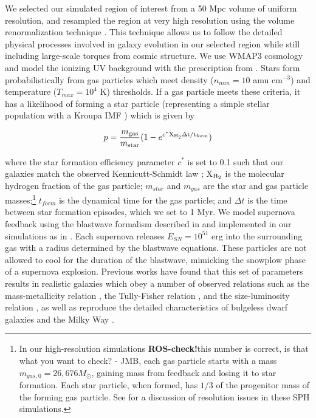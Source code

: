 \documentclass[nofootinbib,twocolumn,prd]{emulateapj}
\newcommand\editremark[1]{{\color{red}#1}}
\begin{document}
We selected our simulated region of interest from a 50 Mpc volume of
uniform resolution, and resampled the region at very high
resolution using the volume renormalization technique \citep{1993ApJ...412..455K}.
This technique allows us to follow the detailed physical processes
involved in galaxy evolution in our selected region while still
including large-scale torques from cosmic structure.  We use
WMAP3 cosmology \citep{WMAP} and model the ionizing UV background
with the prescription from \citet{1996ApJ...461...20H}.  Stars form
probabilistically from gas particles which meet density ($n_{min} =
10$ amu cm$^{-3}$) and temperature ($T_{max} = 10^4$ K) thresholds. If a gas
particle meets these criteria, it has a likelihood of forming a star
particle (representing a simple stellar population with a Kroupa IMF
\citep{2001MNRAS.322..231K}) which is given by

\begin{equation}
p = \frac{m_{\rm gas}}{m_{\rm star}} (1 - e^{c^*\rm X_{\rm H_2} \Delta t/t_{\rm form}})
\end{equation}

\noindent
where the star formation efficiency parameter $c^*$ is set to 0.1 such
that our galaxies match the observed Kennicutt-Schmidt law
\citep{1989ApJ...344..685K};  X$_{\rm H_2}$ is the molecular hydrogen fraction of the gas particle; $m_{star}$ and $m_{gas}$ are the star and gas
particle masses;\footnote{In our high-resolution simulations \textbf{ROS-check!}\editremark{this number is correct, is that what you want to check? - JMB}, each gas particle starts with a mass
  $m_{gas,0}=26,676 M_\odot$, gaining mass from feedback and losing it to star formation.  Each star particle, when
  formed, has $1/3$ of the progenitor mass of the forming gas particle.  See \cite{2010ApJ...717..121C} for a discussion
of resolution issues in these SPH simulations.} $t_{form}$ is the dynamical time for the gas
particle; and $\Delta t$ is the time between star formation episodes,
which we set to 1 Myr.  We model supernova feedback using the
blastwave formalism described in \citet{1977ApJ...218..148M} and implemented in
our simulations as in \citet{2006MNRAS.373.1074S}.  Each supernova releases
$E_{SN} = 10^{51}$ erg into the surrounding gas with a radius
determined by the blastwave equations.  These particles are not
allowed to cool for the duration of the blastwave, mimicking the
snowplow phase of a supernova explosion.  Previous works have found
that this set of parameters results in realistic galaxies which obey a
number of observed relations such as the mass-metallicity relation
\citep{2007ApJ...655L..17B}, the Tully-Fisher relation \citep{2009MNRAS.398..312G}, and
the size-luminosity relation \citep{2011ApJ...728...51B}, as well as reproduce
the detailed characteristics of bulgeless dwarf galaxies
\citep{2010Natur.463..203G} and the Milky Way \citep{2011ApJ...742...76G}.
\end{document}
